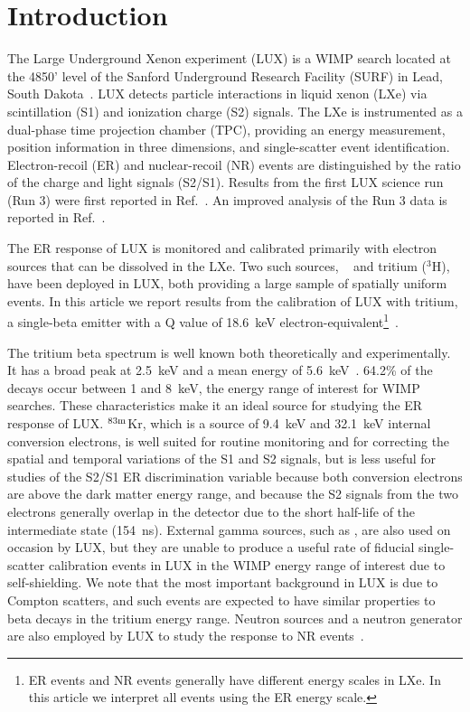 \section{Introduction}

The Large Underground Xenon experiment (LUX) is a WIMP search located at the 4850' level of the Sanford Underground Research Facility (SURF) in Lead, South Dakota~\cite{lux-nim}. LUX detects particle interactions in liquid xenon (LXe) via scintillation (S1) and ionization charge (S2) signals. The LXe is instrumented as a dual-phase time projection chamber (TPC), providing an energy measurement, position information in three dimensions, and single-scatter event identification. Electron-recoil (ER) and nuclear-recoil (NR) events are distinguished by the ratio of the charge and light signals (S2/S1). Results from the first LUX science run (Run 3) were first reported in Ref.~\cite{lux-prl}. An improved analysis of the Run 3 data is reported in Ref.~\cite{lux-reanalysis}.

The ER response of LUX is monitored and calibrated primarily with electron sources that can be dissolved in the LXe. Two such sources,  \krsrc~\cite{Kastens:2009rt, Baudis} and tritium ($^{3}$H), have been deployed in LUX, both providing a large sample of spatially uniform events. In this article we report results from the calibration of LUX with tritium, a single-beta emitter with a Q value of 18.6~keV electron-equivalent\footnote{ER events and NR events generally have different energy scales in LXe. In this article we interpret all events using the ER energy scale.}~\cite{Tritium_Q}. 

The tritium beta spectrum is well known both theoretically and experimentally. It has a broad peak at 2.5~keV and a mean energy of 5.6~keV~\cite{Tritium_Mean,Tritium_Eq,Drexlin:2013lha}. 64.2\% of the decays occur between 1 and 8~keV, the energy range of interest for WIMP searches. These characteristics make it an ideal source for studying the ER response of LUX.  $\rm ^{83m}$Kr, which is a source of 9.4~keV and 32.1~keV internal conversion electrons, is well suited for routine monitoring and for correcting the spatial and temporal variations of the S1 and S2 signals, but is less useful for studies of the S2/S1 ER discrimination variable because both conversion electrons are above the dark matter energy range, and because the S2 signals from the two electrons generally overlap in the detector due to the short half-life of the intermediate state (154~ns). External gamma sources, such as \cssrc,  are also used on occasion by LUX, but they are unable to produce a useful rate of fiducial single-scatter calibration events in LUX in the WIMP energy range of interest due to self-shielding. We note that the most important background in LUX is due to Compton scatters, and such events are expected to have similar properties to beta decays in the tritium energy range. Neutron sources and a neutron generator are also employed by LUX to study the response to NR events~\cite{DD-paper}.

